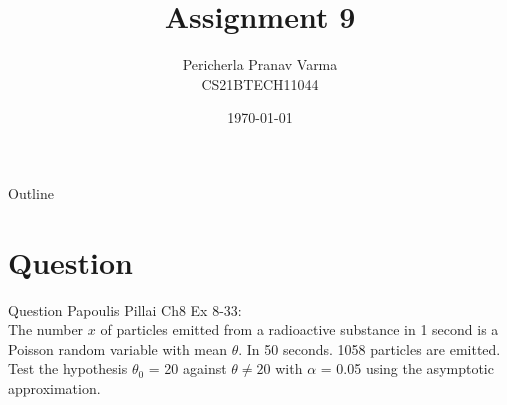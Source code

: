 \documentclass{beamer}
\title{Assignment 9}
\author{Pericherla Pranav Varma\\CS21BTECH11044}
\date{\today}
\begin{document}
    \begin{frame}
        \titlepage 
    \end{frame}

    \begin{frame}{Outline}
        \tableofcontents
    \end{frame}

    \section{Question}
    	\begin{frame}{Question}
    	Papoulis Pillai Ch8 Ex 8-33:\\[9pt]
    	The number $x$ of particles emitted from a radioactive substance in 1 second is a Poisson 	random variable with mean $\theta$. In 50 seconds. 1058 particles are emitted. Test the hypothesis $\theta_0$ = 20 against $\theta \neq 20$ with $\alpha$ = 0.05 using the asymptotic approximation. 
	\end{frame}
%    
\end{document}
